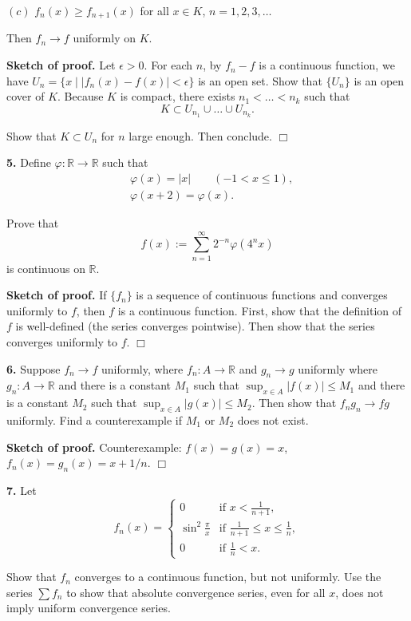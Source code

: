 \documentclass{article}
\begin{document}
$(c)$ $f_n(x) \ge f_{n+1}(x)$ for all $x\in K$, $n=1,2,3,\ldots$

Then $f_n\to f$ uniformly on $K$.

\textbf{Sketch of proof.} Let $\epsilon > 0$. For each $n$, by $f_n - f$
is a continuous function, we have
$U_n = \{x\mid |f_n(x) - f(x)| <\epsilon\}$ is an open set. Show that
$\{U_n\}$ is an open cover of $K$. Because $K$ is compact, there exists
$n_1 < \ldots < n_k$ such that
\[K \subset U_{n_1} \cup \ldots \cup U_{n_k}.\]

Show that $K \subset U_n$ for $n$ large enough. Then conclude. $\Box$

    \textbf{5.} Define $\varphi:\mathbb{R} \to \mathbb{R}$ such that
\[\begin{aligned}
&\varphi(x)= |x| \qquad (-1<x\le 1),\\
&\varphi(x+2) = \varphi(x).
\end{aligned}\]

Prove that \[ f(x) := \sum_{n=1}^{\infty} 2^{-n} \varphi(4^n x) \] is
continuous on $\mathbb{R}$.

\textbf{Sketch of proof.} If $\{f_n\}$ is a sequence of continuous
functions and converges uniformly to $f$, then $f$ is a continuous
function. First, show that the definition of $f$ is well-defined (the
series converges pointwise). Then show that the series converges
uniformly to $f$. $\Box$

    \textbf{6.} Suppose $f_n \to f$ uniformly, where $f_n :A\to \mathbb{R}$
and $g_n \to g$ uniformly where $g_n:A\to \mathbb{R}$ and there is a
constant $M_1$ such that $\sup_{x\in A}|f(x)| \le M_1$ and there is a
constant $M_2$ such that $\sup_{x\in A}|g(x)| \le M_2$. Then show that
$f_ng_n \to fg$ uniformly. Find a counterexample if $M_1$ or $M_2$ does
not exist.

\textbf{Sketch of proof.} Counterexample: $f(x)=g(x)=x$,
$f_n(x) = g_n(x) = x+1/n$. $\Box$

    \textbf{7.} Let \[f_n(x) = \begin{cases}
0 &\text{if } x < \frac{1}{n+1},\\
\sin^2\frac{\pi}{x} &\text{if } \frac{1}{n+1} \le x \le \frac{1}{n},\\
0 & \text{if } \frac{1}{n} < x.
\end{cases}\]

Show that $f_n$ converges to a continuous function, but not uniformly.
Use the series $\sum f_n$ to show that absolute convergence series, even
for all $x$, does not imply uniform convergence series.
\end{document}
